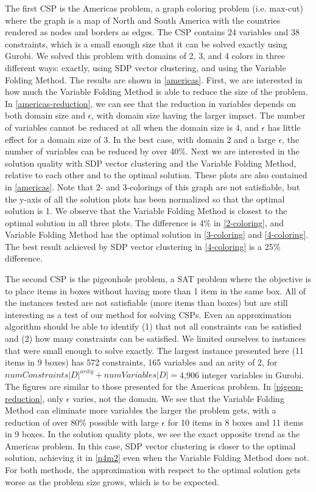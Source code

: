 \documentclass[11pt]{article} %
\begin{document}
The first CSP is the Americas problem, a graph coloring problem (i.e. max-cut) where the graph is a map of North and South America with the countries rendered as nodes and borders as edges. The CSP contains 24 variables and 38 constraints, which is a small enough size that it can be solved exactly using Gurobi. We solved this problem with domains of 2, 3, and 4 colors in three different ways: exactly, using SDP vector clustering, and using the Variable Folding Method. The results are shown in \autoref{americas}. First, we are interested in how much the Variable Folding Method is able to reduce the size of the problem. In \autoref{americas-reduction}, we can see that the reduction in variables depends on both domain size and $\epsilon$, with domain size having the larger impact. The number of variables cannot be reduced at all when the domain size is 4, and $\epsilon$ has little effect for a domain size of 3. In the best case, with domain 2 and a large $\epsilon$, the number of variables can be reduced by over 40\%. Next we are interested in the solution quality with SDP vector clustering and the Variable Folding Method, relative to each other and to the optimal solution. These plots are also contained in \autoref{americas}. Note that 2- and 3-colorings of this graph are not satisfiable, but the y-axis of all the solution plots has been normalized so that the optimal solution is 1. We observe that the Variable Folding Method is closest to the optimal solution in all three plots. The difference is 4\% in \ref{2-coloring}, and Variable Folding Method has the optimal solution in \ref{3-coloring} and \ref{4-coloring}. The best result achieved by SDP vector clustering in \ref{4-coloring} is a 25\% difference.

The second CSP is the pigeonhole problem, a SAT problem where the objective is to place items in boxes without having more than 1 item in the same box. All of the instances tested are not satisfiable (more items than boxes) but are still interesting as a test of our method for solving CSPs. Even an approximation algorithm should be able to identify (1) that not all constraints can be satisfied and (2) how many constraints can be satisfied. We limited ourselves to instances that were small enough to solve exactly. The largest instance presented here (11 items in 9 boxes) has 572 constraints, 165 variables and an arity of 2, for $numConstraints |D|^{arity} + numVariables |D|=$4,906 integer variables in Gurobi. The figures are similar to those presented for the Americas problem. In \autoref{pigeon-reduction}, only $\epsilon$ varies, not the domain. We see that the Variable Folding Method can eliminate more variables the larger the problem gets, with a reduction of over 80\% possible with large $\epsilon$ for 10 items in 8 boxes and 11 items in 9 boxes. In the solution quality plots, we see the exact opposite trend as the Americas problem. In this case, SDP vector clustering is closer to the optimal solution, achieving it in \ref{n4m2} even when the Variable Folding Method does not. For both methods, the approximation with respect to the optimal solution gets worse as the problem size grows, which is to be expected.
\end{document}
